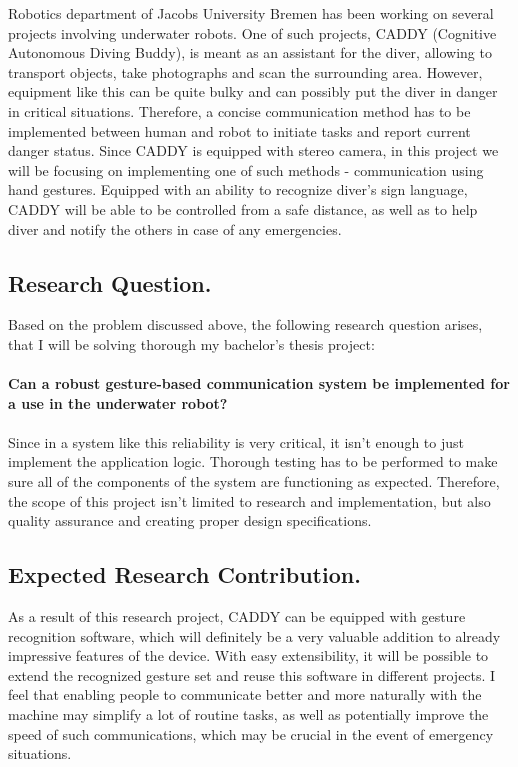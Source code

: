 \documentclass[a4paper,11pt,oneside]{article}
\begin{document}
  Robotics department of Jacobs University Bremen has been working on several projects involving underwater robots. One of such projects, CADDY (Cognitive Autonomous Diving Buddy), is meant as an assistant for the diver, allowing to transport objects, take photographs and scan the surrounding area. However, equipment like this can be quite bulky and can possibly put the diver in danger in critical situations. Therefore, a concise communication method has to be implemented between human and robot to initiate tasks and report current danger status. Since CADDY is equipped with stereo camera, in this project we will be focusing on implementing one of such methods - communication using hand gestures. Equipped with an ability to recognize diver's sign language, CADDY will be able to be controlled from a safe distance, as well as to help diver and notify the others in case of any emergencies.
  
  \subsection{Research Question.}
  
  Based on the problem discussed above, the following research question arises, that I will be solving thorough my bachelor's thesis project:\\\\
  \textbf{Can a robust gesture-based communication system be implemented for a use in the underwater robot?}\\\\
  Since in a system like this reliability is very critical, it isn't enough to just implement the application logic. Thorough testing has to be performed to make sure all of the components of the system are functioning as expected. Therefore, the scope of this project isn't limited to research and implementation, but also quality assurance and creating proper design specifications.
  
  \subsection{Expected Research Contribution.}
  
  As a result of this research project, CADDY can be equipped with gesture recognition software, which will definitely be a very valuable addition to already impressive features of the device. With easy extensibility, it will be possible to extend the recognized gesture set and reuse this software in different projects. I feel that enabling people to communicate better and more naturally with the machine may simplify a lot of routine tasks, as well as potentially improve the speed of such communications, which may be crucial in the event of emergency situations.
  
\end{document}
